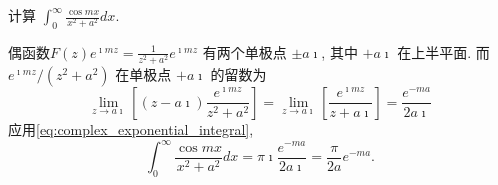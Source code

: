 \begin{example}
计算 $\int_0^{\infty} \frac{\cos m x}{x^2+a^2} d x$.
\end{example}
\begin{solution}
偶函数$F(z) e^{\imath m z}=\frac{1}{z^2+a^2} e^{\imath m z}$ 有两个单极点 $\pm a \imath$, 其中 $+a \imath$ 在上半平面. 而 $e^{\imath m z} /\left(z^2+a^2\right)$ 在单极点 $+a \imath$ 的留数为
    $$
    \lim _{z \rightarrow a \imath}\left[(z-a \imath) \frac{e^{\imath m z}}{z^2+a^2}\right]=\lim _{z \rightarrow a \imath}\left[\frac{e^{\imath m z}}{z+a \imath}\right]=\frac{e^{-m a}}{2 a \imath}
    $$
    应用\eqref{eq:complex_exponential_integral},
    $$
    \int_0^{\infty} \frac{\cos m x}{x^2+a^2} d x=\pi \imath \frac{e^{-m a}}{2 a \imath}=\frac{\pi}{2 a} e^{-m a}.
    $$
\end{solution}